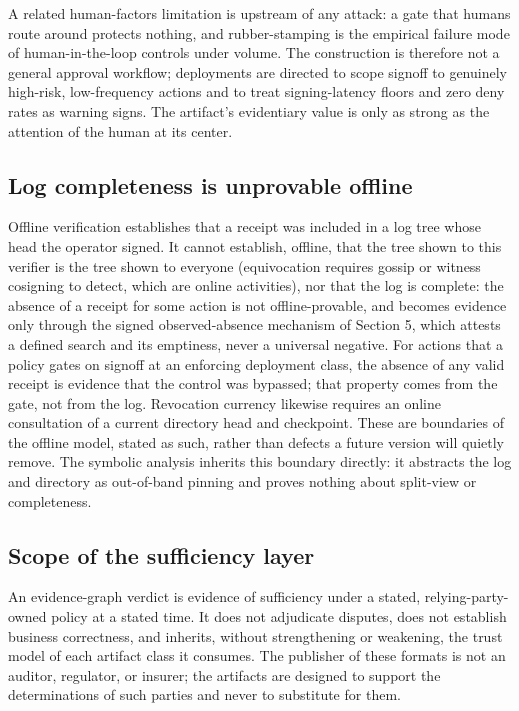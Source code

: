 \documentclass[11pt]{article}
\begin{document}
A related human-factors limitation is upstream of any attack: a gate that humans
route around protects nothing, and rubber-stamping is the empirical failure mode of
human-in-the-loop controls under volume. The construction is therefore not a general
approval workflow; deployments are directed to scope signoff to genuinely high-risk,
low-frequency actions and to treat signing-latency floors and zero deny rates as
warning signs. The artifact's evidentiary value is only as strong as the attention
of the human at its center.

\subsection{Log completeness is unprovable offline}

Offline verification establishes that a receipt was included in a log tree whose
head the operator signed. It cannot establish, offline, that the tree shown to this
verifier is the tree shown to everyone (equivocation requires gossip or witness
cosigning to detect, which are online activities), nor that the log is complete: the
absence of a receipt for some action is not offline-provable, and becomes evidence
only through the signed observed-absence mechanism of Section 5, which attests a
defined search and its emptiness, never a universal negative. For actions that a
policy gates on signoff at an enforcing deployment class, the absence of any valid
receipt is evidence that the control was bypassed; that property comes from the
gate, not from the log. Revocation currency likewise requires an online consultation
of a current directory head and checkpoint. These are boundaries of the offline
model, stated as such, rather than defects a future version will quietly remove. The
symbolic analysis inherits this boundary directly: it abstracts the log and
directory as out-of-band pinning and proves nothing about split-view or
completeness.

\subsection{Scope of the sufficiency layer}

An evidence-graph verdict is evidence of sufficiency under a stated,
relying-party-owned policy at a stated time. It does not adjudicate disputes, does
not establish business correctness, and inherits, without strengthening or
weakening, the trust model of each artifact class it consumes. The publisher of
these formats is not an auditor, regulator, or insurer; the artifacts are designed
to support the determinations of such parties and never to substitute for them.
\end{document}

